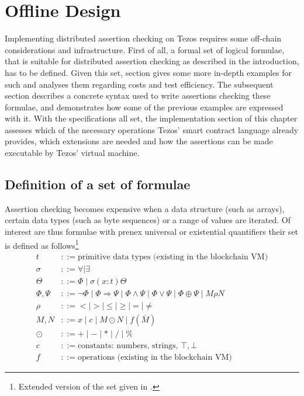 \chapter{Offline Design}\label{chap:offline}
Implementing distributed assertion checking on Tezos requires some off-chain considerations and infrastructure. First of all, a formal set of logical formulae, that is suitable for distributed assertion checking as described in the introduction, has to be defined. Given this set, section  gives some more in-depth examples for such and analyses them regarding costs and test efficiency. The subsequent section describes a concrete syntax used to write assertions checking these formulae, and demonstrates how some of the previous examples are expressed with it. With the specifications all set, the implementation section of this chapter assesses which of the necessary operations Tezos' smart contract language already provides, which extensions are needed and how the assertions can be made executable by Tezos' virtual machine.

\section{Definition of a set of formulae}\label{sec:formulae} 
Assertion checking becomes expensive when a data structure (such as arrays), certain data types (such as byte sequences) or a range of values are iterated. Of interest are thus formulae with prenex universal or existential quantifiers their set is defined as follows\footnote{Extended version of the set given in \cite{thiemann_2020}.}
  \begin{align*}
    t &::= \text{primitive data types (existing in the blockchain VM)} \\
    \sigma &::= \forall \mid \exists \\
    \Theta &::= \Phi \mid \sigma (x:t) \Theta \\
    \Phi,\Psi &::= \neg\Phi \mid \Phi \Rightarrow \Psi \mid \Phi\wedge\Psi \mid
    				\Phi\vee\Psi \mid \Phi \oplus \Psi \mid M \rho N \\
    \rho &::= < \mid > \mid \le \mid \ge \mid = \mid \ne \\
    M, N &::= x \mid c \mid M \odot N  \mid f (\overline M) \\
    \odot &::= +\mid -\mid * \mid / \mid \% \\
    c &::= \text{constants: numbers, strings, } \top, \bot \\
    f &::= \text{operations (existing in the blockchain VM)}
  \end{align*}

